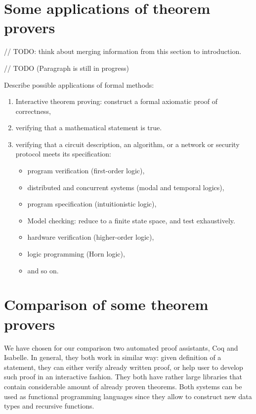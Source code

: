 \documentclass[article]{aaltoseries}
\begin{document}



\section{Some applications of theorem provers}
\label{sec:applications}

// TODO: think about merging information from this section to introduction.

// TODO (Paragraph is still in progress) 

Describe possible applications of formal methods:
\begin{enumerate}
	\itemsep0em
	\item Interactive theorem proving: construct a formal axiomatic proof of correctness, 
	\item verifying that a mathematical statement is true.
	\item verifying that a circuit description, an algorithm, or a network or security protocol meets its specification:
	\begin{itemize}
		\item program verification (first-order logic), 
		\item distributed and concurrent systems (modal and temporal logics), 
		\item program specification (intuitionistic logic),
		\item Model checking: reduce to a finite state space, and test exhaustively.
		\item hardware verification (higher-order logic), 
		\item logic programming (Horn logic), 
		\item and so on.
	\end{itemize}
\end{enumerate}



\section{Comparison of some theorem provers}
\label{sec:comparison}

We have chosen for our comparison two automated proof assistants, Coq and Isabelle. 
In general, they both work in similar way: given definition of a statement, they can either verify already written proof, or help user to develop such proof in an interactive fashion. They both have rather large libraries that contain considerable amount of already proven theorems. 
Both systems can be used as functional programming languages since they allow to construct new data types and recursive functions.
\end{document}

